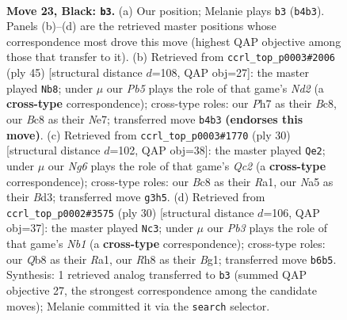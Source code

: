 \documentclass[11pt]{article}
\begin{document}
\clearpage

\begin{figure}[p]\centering
\begin{subfigure}{0.46\textwidth}\centering
\resizebox{\linewidth}{!}{%
\newchessgame
\chessboard[
  setfen={rqb1k2r/p3b1pp/1p6/n2p1p2/Pp1P3P/4P1nB/RBQN1PK1/1N2R3 b - - 1 23},
  showmover=false,
  pgfstyle=straightmove, color=movearrow, markmove={b4-b3}
]}
\caption{}
\end{subfigure}\hfill
\begin{subfigure}{0.46\textwidth}\centering
\resizebox{\linewidth}{!}{%
\newchessgame
\chessboard[
  setfen={2b2r1k/3nnqp1/1p1b3p/3p4/P2Pp3/7P/1P2QPPN/R1B1RN1K b - - 0 23},
  showmover=false,
  pgfstyle=straightmove, color=movearrow, markmove={d7-b8}
]}
\caption{}
\end{subfigure}
\\[4pt]
\begin{subfigure}{0.46\textwidth}\centering
\resizebox{\linewidth}{!}{%
\newchessgame
\chessboard[
  setfen={2r1k2r/1b1nbppp/pp1qp3/8/P2PP3/3B1N2/2Q2PPP/R1B1K2R w KQk - 1 16},
  showmover=false,
  pgfstyle=straightmove, color=movearrow, markmove={c2-e2}
]}
\caption{}
\end{subfigure}\hfill
\begin{subfigure}{0.46\textwidth}\centering
\resizebox{\linewidth}{!}{%
\newchessgame
\chessboard[
  setfen={rn2kb1r/ppqn1ppp/4p3/1b6/2NQP1P1/5P1P/PP2B3/RN2K1BR w KQkq - 5 16},
  showmover=false,
  pgfstyle=straightmove, color=movearrow, markmove={b1-c3}
]}
\caption{}
\end{subfigure}
\caption{\textbf{Move 23, Black: \texttt{b3}.} (a) Our position; Melanie plays \texttt{b3} (\texttt{b4b3}). Panels (b)--(d) are the retrieved master positions whose correspondence most drove this move (highest QAP objective among those that transfer to it). (b) Retrieved from \texttt{ccrl\_top\_p0003\#2006} (ply 45) [structural distance $d$=108, QAP obj=27]: the master played \texttt{Nb8}; under $\mu$ our \emph{Pb5} plays the role of that game's \emph{Nd2} (a \textbf{cross-type} correspondence); cross-type roles: our \emph{P}h7 as their \emph{B}c8, our \emph{B}c8 as their \emph{N}e7; transferred move \texttt{b4b3} \textbf{(endorses this move)}. (c) Retrieved from \texttt{ccrl\_top\_p0003\#1770} (ply 30) [structural distance $d$=102, QAP obj=38]: the master played \texttt{Qe2}; under $\mu$ our \emph{Ng6} plays the role of that game's \emph{Qc2} (a \textbf{cross-type} correspondence); cross-type roles: our \emph{B}c8 as their \emph{R}a1, our \emph{N}a5 as their \emph{B}d3; transferred move \texttt{g3h5}. (d) Retrieved from \texttt{ccrl\_top\_p0002\#3575} (ply 30) [structural distance $d$=106, QAP obj=37]: the master played \texttt{Nc3}; under $\mu$ our \emph{Pb3} plays the role of that game's \emph{Nb1} (a \textbf{cross-type} correspondence); cross-type roles: our \emph{Q}b8 as their \emph{R}a1, our \emph{R}h8 as their \emph{B}g1; transferred move \texttt{b6b5}. Synthesis: 1 retrieved analog transferred to \texttt{b3} (summed QAP objective 27, the strongest correspondence among the candidate moves); Melanie committed it via the \texttt{search} selector.}
\label{fig:thought-m45}
\end{figure}
\end{document}
